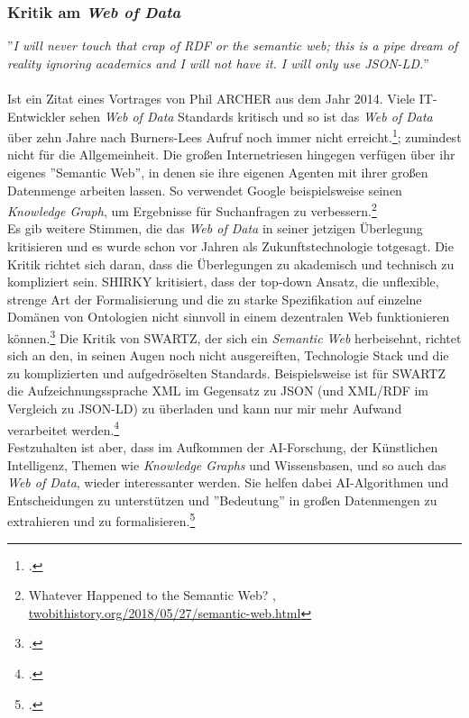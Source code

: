 \documentclass[12pt,a4paper]{article}
\begin{document}
\subsubsection{Kritik am \textit{Web of Data}}
''\textit{I will never touch that crap of RDF or the semantic web; this is a pipe dream of reality ignoring academics and I will not have it. I will only use JSON-LD.}''
\\
\\
Ist ein Zitat eines Vortrages von Phil ARCHER aus dem Jahr 2014. Viele IT-Entwickler sehen \textit{Web of Data} Standards kritisch und so ist das \textit{Web of Data} über zehn Jahre nach Burners-Lees Aufruf noch immer nicht erreicht.\footcite{wettlaufer2018semanticwebEdition}; zumindest nicht für die Allgemeinheit. Die großen Internetriesen hingegen verfügen über ihr eigenes ''Semantic Web'', in denen sie ihre eigenen Agenten mit ihrer großen Datenmenge arbeiten lassen. So verwendet Google beispielsweise seinen \textit{Knowledge Graph}, um Ergebnisse für Suchanfragen zu verbessern.\footnote{Whatever Happened to the Semantic Web? , \url{twobithistory.org/2018/05/27/semantic-web.html}}
\\
Es gib weitere Stimmen, die das \textit{Web of Data} in seiner jetzigen Überlegung kritisieren und es wurde schon vor Jahren als Zukunftstechnologie totgesagt. Die Kritik richtet sich daran, dass die Überlegungen zu akademisch und technisch zu kompliziert sein. SHIRKY kritisiert, dass der top-down Ansatz, die unflexible, strenge Art der Formalisierung und die zu starke Spezifikation auf einzelne Domänen von Ontologien nicht sinnvoll in einem dezentralen Web funktionieren können.\footcite{shirky2005ontology} Die Kritik von SWARTZ, der sich ein \textit{Semantic Web} herbeisehnt, richtet sich an den, in seinen Augen noch nicht ausgereiften, Technologie Stack und die zu komplizierten und aufgedröselten Standards. Beispielsweise ist für SWARTZ die Aufzeichnungssprache XML im Gegensatz zu JSON (und XML/RDF im Vergleich zu JSON-LD) zu überladen und kann nur mir mehr Aufwand verarbeitet werden.\footcite{swartz2013aaron}
\\
Festzuhalten ist aber, dass im Aufkommen der AI-Forschung, der Künstlichen Intelligenz, Themen wie \textit{Knowledge Graphs} und Wissensbasen, und so auch das \textit{Web of Data}, wieder interessanter werden. Sie helfen dabei AI-Algorithmen und Entscheidungen zu unterstützen und ''Bedeutung'' in großen Datenmengen zu extrahieren und zu formalisieren.\footcite[][]{bernstein2016new}
\end{document}
